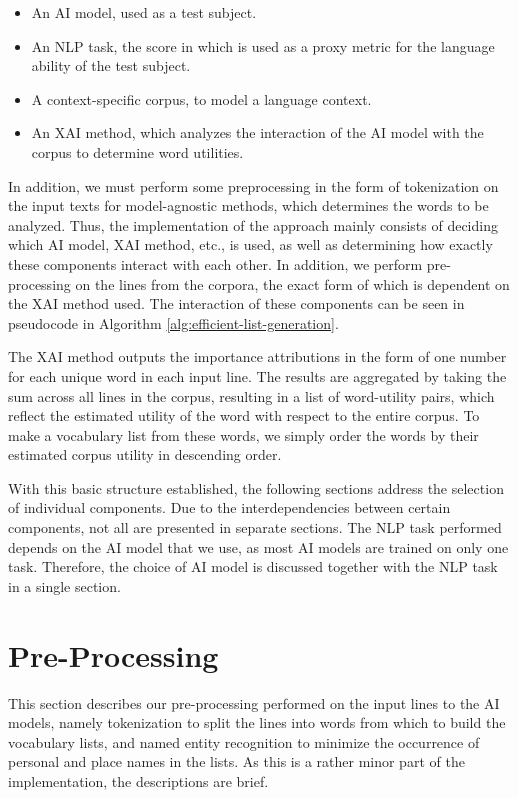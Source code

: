 \begin{itemize}
	\item An AI model, used as a test subject.
	\item An NLP task, the score in which is used as a proxy metric for the language ability of the test subject.
	\item A context-specific corpus, to model a language context.
	\item An XAI method, which analyzes the interaction of the AI model with the corpus to determine word utilities.
\end{itemize}

In addition, we must perform some preprocessing in the form of tokenization on the input texts for model-agnostic methods, which determines the words to be analyzed.
Thus, the implementation of the approach mainly consists of deciding which AI model, XAI method, etc., is used, as well as determining how exactly these components interact with each other.
In addition, we perform pre-processing on the lines from the corpora, the exact form of which is dependent on the XAI method used.
The interaction of these components can be seen in pseudocode in Algorithm \ref{alg:efficient-list-generation}.



The XAI method outputs the importance attributions in the form of one number for each unique word in each input line.
The results are aggregated by taking the sum across all lines in the corpus, resulting in a list of word-utility pairs, which reflect the estimated utility of the word with respect to the entire corpus.
To make a vocabulary list from these words, we simply order the words by their estimated corpus utility in descending order.

With this basic structure established, the following sections address the selection of individual components.
Due to the interdependencies between certain components, not all are presented in separate sections.
The NLP task performed depends on the AI model that we use, as most AI models are trained on only one task.
Therefore, the choice of AI model is discussed together with the NLP task in a single section.

\section{Pre-Processing}
This section describes our pre-processing performed on the input lines to the AI models, namely tokenization to split the lines into words from which to build the vocabulary lists, and named entity recognition to minimize the occurrence of personal and place names in the lists.
As this is a rather minor part of the implementation, the descriptions are brief.

